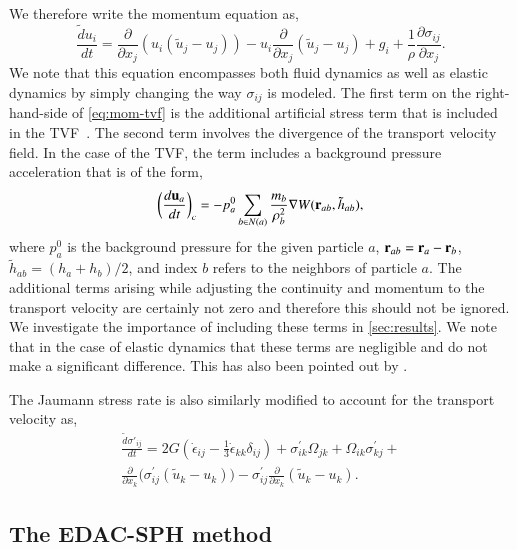 %
We therefore write the momentum equation as,
\begin{equation}
  \label{eq:mom-tvf}
  \frac{\tilde{d} u_i}{d t} =
  \frac{\partial}{\partial x_j} (u_i (\tilde{u}_j - u_j))
  - u_i \frac{\partial}{\partial x_j} (\tilde{u}_j - u_j)
  + g_i
  +\frac{1}{\rho} \frac{\partial \sigma_{ij}}{\partial x_j}.
\end{equation}
We note that this equation encompasses both fluid dynamics as well as elastic
dynamics by simply changing the way $\sigma_{ij}$ is modeled. The first term
on the right-hand-side of \cref{eq:mom-tvf} is the additional artificial
stress term that is included in the TVF~\citep{Adami2013}. The second term
involves the divergence of the transport velocity field. In the case of the
TVF, the term includes a background pressure acceleration that is of the form,
\begin{equation}
  \label{eq:tvf-accel}
  \bigg(\frac{d \mathbf{u}_a}{dt}\bigg)_{c} = - p^0_a \sum_{b \in N(a)}
  \frac{m_b}{\rho_b^2} \nabla W(\mathbf{r}_{ab}, \tilde{h}_{ab}),
\end{equation}
where $p^0_a$ is the background pressure for the given particle $a$,
$\mathbf{r}_{ab} = \mathbf{r}_a - \mathbf{r}_b$, $\tilde{h}_{ab} = (h_a + h_b)/2$, and
index $b$ refers to the neighbors of particle $a$. The additional terms arising
while adjusting the continuity and momentum to the transport velocity are
certainly not zero and therefore this should not be ignored. We investigate the
importance of including these terms in \cref{sec:results}. We note that in the
case of elastic dynamics that these terms are negligible and do not make a
significant difference. This has also been pointed out by
\cite{zhang_hu_adams17}.

The Jaumann stress rate is also similarly modified to account for the
transport velocity as,
\begin{multline}
  \label{eq:modified-jaumann-stress-rate}
  \frac{\tilde{d} \sigma'_{ij}}{dt} = 2G (\dot{\epsilon}_{ij} - \frac{1}{3}
  \dot{\epsilon}_{kk} \delta_{ij}) + \sigma^{'}_{ik}  \Omega_{jk} +
  \Omega_{ik} \sigma^{'}_{kj} + \\
  \frac{\partial}{\partial x_k}\big(\sigma^{'}_{ij}  (\tilde{u}_k - u_k)\big)
  - \sigma^{'}_{ij} \frac{\partial}{\partial x_k} (\tilde{u}_k - u_k).
\end{multline}


\subsection{The EDAC-SPH method}
\label{sec:edac-tvf}

